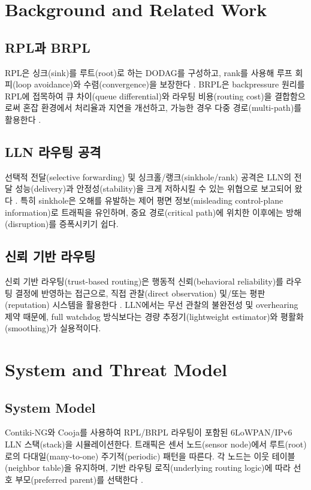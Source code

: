 \documentclass[11pt,a4paper]{article}
\begin{document}
\section{Background and Related Work}
\label{sec:background}
\subsection{RPL과 BRPL}
RPL은 싱크(sink)를 루트(root)로 하는 DODAG를 구성하고, rank를 사용해 루프 회피(loop avoidance)와 수렴(convergence)을 보장한다 \citep{rfc6550}. BRPL은 backpressure 원리를 RPL에 접목하여 큐 차이(queue differential)와 라우팅 비용(routing cost)을 결합함으로써 혼잡 환경에서 처리율과 지연을 개선하고, 가능한 경우 다중 경로(multi-path)를 활용한다 \citep{moeller2016brpl}.

\subsection{LLN 라우팅 공격}
선택적 전달(selective forwarding) 및 싱크홀/랭크(sinkhole/rank) 공격은 LLN의 전달 성능(delivery)과 안정성(stability)을 크게 저하시킬 수 있는 위협으로 보고되어 왔다 \citep{karlof2003secure,wood2002dos,le2013rank,mayzaud2016taxonomy}. 특히 sinkhole은 오해를 유발하는 제어 평면 정보(misleading control-plane information)로 트래픽을 유인하며, 중요 경로(critical path)에 위치한 이후에는 방해(disruption)를 증폭시키기 쉽다.

\subsection{신뢰 기반 라우팅}
신뢰 기반 라우팅(trust-based routing)은 행동적 신뢰(behavioral reliability)를 라우팅 결정에 반영하는 접근으로, 직접 관찰(direct observation) 및/또는 평판(reputation) 시스템을 활용한다 \citep{ganeriwal2004reputation,ganeriwal2008tosn,momani2010survey}. LLN에서는 무선 관찰의 불완전성 및 overhearing 제약 때문에, full watchdog 방식보다는 경량 추정기(lightweight estimator)와 평활화(smoothing)가 실용적이다.

\section{System and Threat Model}
\label{sec:model}
\subsection{System Model}
Contiki-NG와 Cooja를 사용하여 RPL/BRPL 라우팅이 포함된 6LoWPAN/IPv6 LLN 스택(stack)을 시뮬레이션한다. 트래픽은 센서 노드(sensor node)에서 루트(root)로의 다대일(many-to-one) 주기적(periodic) 패턴을 따른다. 각 노드는 이웃 테이블(neighbor table)을 유지하며, 기반 라우팅 로직(underlying routing logic)에 따라 선호 부모(preferred parent)를 선택한다 \citep{rfc6550,moeller2016brpl}.
\end{document}
